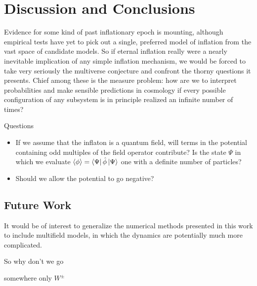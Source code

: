 \section{Discussion and Conclusions}

Evidence for some kind of past inflationary epoch is mounting, although empirical tests have yet to pick out a single, preferred model of inflation from the vast space of candidate models.  So if eternal inflation really were a nearly inevitable implication of any simple inflation mechanism, we would be forced to take very seriously the multiverse conjecture and confront the thorny questions it presents.  Chief among these is the measure problem: how are we to interpret probabilities and make sensible predictions in cosmology if every possible configuration of any subsystem is in principle realized an infinite number of times?

Questions
\begin{itemize}

\item If we assume that the inflaton is a quantum field, will terms in the potential containing odd multiples of the field operator contribute?  Is the state $\Psi$ in which we evaluate $\left\langle \phi \right\rangle = \left\langle \Psi \right\rvert\hat\phi\left\lvert \Psi \right\rangle$ one with a definite number of particles?

\item Should we allow the potential to go negative?

\end{itemize}

\subsection{Future Work}

It would be of interest to generalize the numerical methods presented in this work to include multifield models, in which the dynamics are potentially much more complicated.

So why don't we go

somewhere only $W^{\pm}$